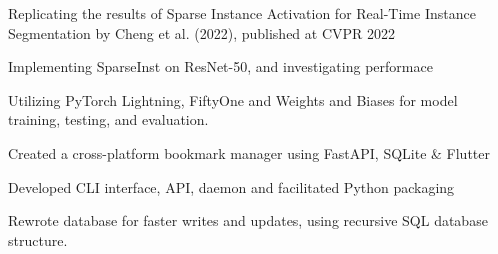 \documentclass[]{resume-template}
\begin{document}
\begin{minipage}[t]{0.66\textwidth}
  \label{subsec:sparseinst}
  \begin{tightemize}
  \item Replicating the results of Sparse Instance Activation for Real-Time Instance Segmentation by Cheng et al. (2022), published at CVPR 2022
  \item Implementing SparseInst on ResNet-50, and investigating performace
  \item Utilizing PyTorch Lightning, FiftyOne and Weights and Biases for model training, testing, and evaluation.

  \end{tightemize}
  \label{subsec: Bookie}
  \begin{tightemize}
  \item Created a cross-platform bookmark manager using FastAPI, SQLite \& Flutter
  \item Developed CLI interface, API, daemon and facilitated Python packaging
  \item Rewrote database for faster writes and updates, using recursive SQL database structure. \\
  \end{tightemize}


\end{minipage}
\end{document}
